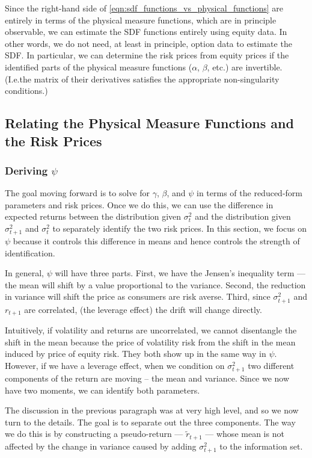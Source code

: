 \documentclass[11pt, letterpaper, twoside, final]{article}
\begin{document}
Since the right-hand side of \cref{eqn:sdf_functions_vs_physical_functions} are entirely in terms of the physical
measure functions, which are in principle observable, we can estimate the SDF functions entirely using equity
data.
In other words, we do not need, at least in principle, option data to estimate the SDF.
In particular, we can determine the risk prices from equity prices if the identified parts of the physical measure
functions ($\alpha$, $\beta$, etc.) are  invertible.
(I.e.\@ the matrix of their derivatives satisfies the appropriate non-singularity conditions.)

\subsection{Relating the Physical Measure Functions and the Risk Prices}

\subsubsection{Deriving \texorpdfstring{$\psi$}{psi}}

The goal moving forward is to solve for $\gamma$, $\beta$, and $\psi$ in terms of the reduced-form parameters and
risk prices. 
Once we do this, we can use the difference in expected returns between the distribution given $\sigma^2_t$ and the
distribution given $\sigma^2_{t+1}$ and $\sigma^2_t$ to separately identify the two risk prices.
In this section, we focus on $\psi$ because it controls this difference in means and hence controls the strength
of identification.

In general, $\psi$ will have three parts.
First, we have the Jensen's inequality term --- the mean will shift by a value proportional to the variance.
Second, the reduction in variance will shift the price as consumers are risk averse.
Third, since $\sigma^2_{t+1}$ and $r_{t+1}$ are correlated, (the leverage effect) the drift will change directly. 

Intuitively, if volatility and returns are uncorrelated, we cannot disentangle the shift in the mean because the
price of volatility risk from the shift in the mean induced by price of equity risk.
They both show up in the same way in $\psi$.
However, if we have a leverage effect, when we condition on $\sigma^2_{t+1}$ two different components of the
return are moving -- the mean and variance.
Since we now have two moments, we can identify both parameters.

The discussion in the previous paragraph was at very high level, and so we now turn to the details.
The goal is to separate out the three components.
The way we do this is by constructing a pseudo-return --- $\widetilde{r}_{t+1}$ --- whose mean is not affected by
the change in variance caused by adding $\sigma^2_{t+1}$ to the information set.
\end{document}
